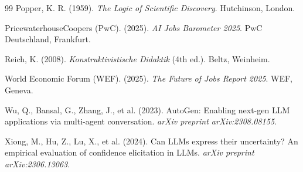 \documentclass[10pt,a4paper]{article}
\begin{document}
\begin{thebibliography}{99}
Popper, K. R. (1959).
\newblock \textit{The Logic of Scientific Discovery}.
\newblock Hutchinson, London.

PricewaterhouseCoopers (PwC). (2025).
\newblock \textit{AI Jobs Barometer 2025}.
\newblock PwC Deutschland, Frankfurt.

Reich, K. (2008).
\newblock \textit{Konstruktivistische Didaktik} (4th ed.).
\newblock Beltz, Weinheim.

World Economic Forum (WEF). (2025).
\newblock \textit{The Future of Jobs Report 2025}.
\newblock WEF, Geneva.

Wu, Q., Bansal, G., Zhang, J., et al. (2023).
\newblock AutoGen: Enabling next-gen LLM applications via multi-agent conversation.
\newblock \textit{arXiv preprint arXiv:2308.08155}.

Xiong, M., Hu, Z., Lu, X., et al. (2024).
\newblock Can LLMs express their uncertainty? An empirical evaluation of confidence elicitation in LLMs.
\newblock \textit{arXiv preprint arXiv:2306.13063}.

\end{thebibliography}
\end{document}
